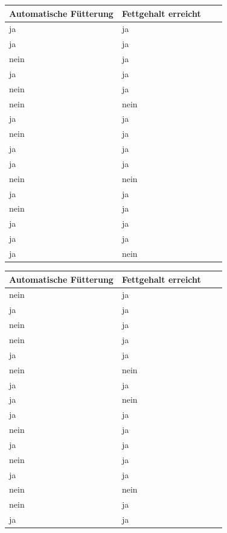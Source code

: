 \documentclass[a4paper, 9pt]{scrartcl}\usepackage[]{graphicx}\usepackage[]{xcolor}
\begin{document}
\begin{center}
\begin{minipage}[t]{0.45\textwidth}
\small
\begin{center}

\begin{tabular}{p{2.5cm}p{2.5cm}p{2.5cm}p{2.5cm}}
\toprule
Automatische Fütterung & Fettgehalt erreicht\\
\midrule
ja & ja\\
ja & ja\\
nein & ja\\
ja & ja\\
nein & ja\\
\addlinespace
nein & nein\\
ja & ja\\
nein & ja\\
ja & ja\\
ja & ja\\
\addlinespace
nein & nein\\
ja & ja\\
nein & ja\\
ja & ja\\
ja & ja\\
\addlinespace
ja & nein\\
\bottomrule
\end{tabular}


\end{center}
\end{minipage}
\begin{minipage}[t]{0.45\textwidth}
\small
\begin{center}

\begin{tabular}{p{2.5cm}p{2.5cm}p{2.5cm}p{2.5cm}}
\toprule
Automatische Fütterung & Fettgehalt erreicht\\
\midrule
nein & ja\\
ja & ja\\
nein & ja\\
nein & ja\\
ja & ja\\
\addlinespace
nein & nein\\
ja & ja\\
ja & nein\\
ja & ja\\
nein & ja\\
\addlinespace
ja & ja\\
nein & ja\\
ja & ja\\
nein & nein\\
nein & ja\\
\addlinespace
ja & ja\\
\bottomrule
\end{tabular}


\end{center}
\end{minipage}
\end{center}
\end{document}
